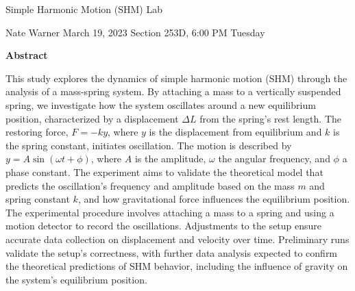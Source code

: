 \documentclass{report}
\title{\Huge{}}
\author{\huge{Nathan Warner}}
\date{\huge{}}
\begin{document}
%
%
%             
%
%
%             
%             
%      
%        
%             
\begin{center}
    \begin{Huge}
        Simple Harmonic Motion (SHM) Lab
    \end{Huge}
    \begin{Large}
        \bigbreak \noindent 
        Nate Warner
        \smallbreak \noindent
        March 19, 2023
        \bigbreak \noindent 
        Section 253D, 6:00 PM Tuesday 
    \end{Large}
\end{center}
\pagebreak 
\tableofcontents
\pagebreak \bigbreak \noindent 
\begin{center}
    \textbf{Abstract}
\end{center}
\begin{adjustwidth}{.3in}{.3in}
    \hspace{\parindent} This study explores the dynamics of simple harmonic motion (SHM) through the analysis of a mass-spring system. By attaching a mass to a vertically suspended spring, we investigate how the system oscillates around a new equilibrium position, characterized by a displacement $\Delta L$ from the spring's rest length. The restoring force, $F = -ky$, where $y$ is the displacement from equilibrium and $k$ is the spring constant, initiates oscillation. The motion is described by $y= A\sin(\omega t + \phi)$, where $A$ is the amplitude, $\omega$ the angular frequency, and $\phi$ a phase constant. The experiment aims to validate the theoretical model that predicts the oscillation's frequency and amplitude based on the mass $m$ and spring constant $k$, and how gravitational force influences the equilibrium position.
    \bigbreak \noindent 
    The experimental procedure involves attaching a mass to a spring and using a motion detector to record the oscillations. Adjustments to the setup ensure accurate data collection on displacement and velocity over time. Preliminary runs validate the setup's correctness, with further data analysis expected to confirm the theoretical predictions of SHM behavior, including the influence of gravity on the system's equilibrium position.
\end{adjustwidth}
\end{document}
